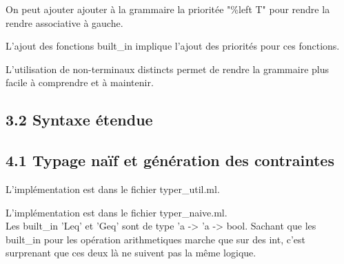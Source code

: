 \documentclass{article}
\begin{document}
{
  On peut ajouter ajouter à la grammaire la prioritée "\%left T" pour rendre la rendre associative à gauche.
}
{}


{
  L'ajout des fonctions built\_in implique l'ajout des priorités pour ces fonctions.
}
{}

{
  L'utilisation de non-terminaux distincts permet de rendre la grammaire plus facile à comprendre et à maintenir.
}
{}

\subsection{3.2 Syntaxe étendue}



\subsection{4.1 Typage naïf et génération des contraintes}

{
  L'implémentation est dans le fichier typer\_util.ml.\\
}
{}

{
  L'implémentation est dans le fichier typer\_naive.ml.\\
}
{
  Les built\_in 'Leq' et 'Geq' sont de type 'a -> 'a -> bool. 
  Sachant que les built\_in pour les
  opération arithmetiques marche que sur des int, c'est surprenant que ces deux 
  là ne suivent pas la même logique.
}
\end{document}
